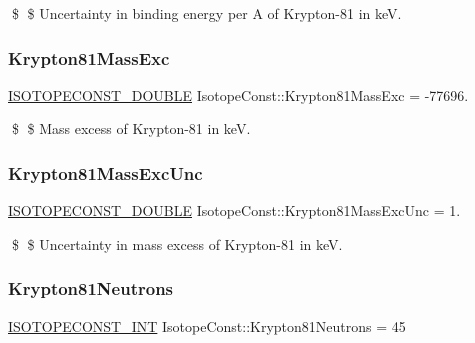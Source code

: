\$ \$ Uncertainty in binding energy per A of Krypton-\/81 in keV. \mbox{\label{group___isotope_const-_krypton-_kr81_gae06f0f664452e0daca8587cdd5ce15c2}} 
\subsubsection{\texorpdfstring{Krypton81\+Mass\+Exc}{Krypton81MassExc}}
{\footnotesize\ttfamily \mbox{\hyperlink{group___isotope_const-_macros_ga8f45a7272ce02c0b4c65c44636ed719a}{I\+S\+O\+T\+O\+P\+E\+C\+O\+N\+S\+T\+\_\+\+D\+O\+U\+B\+LE}} Isotope\+Const\+::\+Krypton81\+Mass\+Exc = -\/77696.}

\$ \$ Mass excess of Krypton-\/81 in keV. \mbox{\label{group___isotope_const-_krypton-_kr81_ga82e0ec29bce55b3cfced580b6084cc2c}} 
\subsubsection{\texorpdfstring{Krypton81\+Mass\+Exc\+Unc}{Krypton81MassExcUnc}}
{\footnotesize\ttfamily \mbox{\hyperlink{group___isotope_const-_macros_ga8f45a7272ce02c0b4c65c44636ed719a}{I\+S\+O\+T\+O\+P\+E\+C\+O\+N\+S\+T\+\_\+\+D\+O\+U\+B\+LE}} Isotope\+Const\+::\+Krypton81\+Mass\+Exc\+Unc = 1.}

\$ \$ Uncertainty in mass excess of Krypton-\/81 in keV. \mbox{\label{group___isotope_const-_krypton-_kr81_ga371c2c44c24ed7a68563188131ff343c}} 
\subsubsection{\texorpdfstring{Krypton81\+Neutrons}{Krypton81Neutrons}}
{\footnotesize\ttfamily \mbox{\hyperlink{group___isotope_const-_macros_ga5f18360b3e99483a35c32d789e62621c}{I\+S\+O\+T\+O\+P\+E\+C\+O\+N\+S\+T\+\_\+\+I\+NT}} Isotope\+Const\+::\+Krypton81\+Neutrons = 45}

